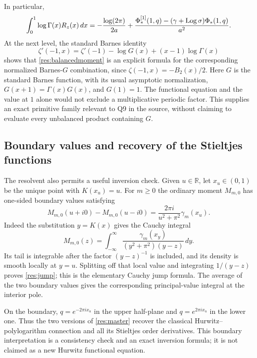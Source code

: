 In particular,
\begin{equation}\label{res:loggammamoment}
 \int_0^1\log\Gamma(x)R_z(x)\,dx
 =-\frac{\log(2\pi)}{2a}
   +\frac{\Phi_*^{[1]}(1,q)
                 -(\gamma+\operatorname{Log}\sigma)\Phi_*(1,q)}{a^2}.
\end{equation}
At the next level, the standard Barnes identity
\cite{Vardi}
\[
 \zeta'(-1,x)=\zeta'(-1)-\log G(x)+(x-1)\log\Gamma(x)
\]
shows that \eqref{res:balancedmoment} is an explicit formula for
the corresponding normalized Barnes-$G$ combination, since
$\zeta(-1,x)=-B_2(x)/2$. Here $G$ is the standard Barnes function, with its usual asymptotic
normalization, $G(x+1)=\Gamma(x)G(x)$, and $G(1)=1$. The
functional equation and the value at $1$ alone would not exclude
a multiplicative periodic factor. This supplies an exact primitive
family relevant to Q9 in the source, without claiming to evaluate
every unbalanced product containing $G$.

\subsection{Boundary values and recovery of the Stieltjes functions}

The resolvent also permits a useful inversion check. Given
$u\in\mathbb R$, let $x_u\in(0,1)$ be the unique point with
$K(x_u)=u$. For $m\ge0$ the ordinary moment $M_{m,0}$ has
one-sided boundary values satisfying
\begin{equation}\label{res:jump}
 M_{m,0}(u+i0)-M_{m,0}(u-i0)
       =\frac{2\pi i}{u^2+\pi^2}\gamma_m(x_u).
\end{equation}
Indeed the substitution $y=K(x)$ gives the Cauchy integral
\[
 M_{m,0}(z)=\int_{-\infty}^{\infty}
      \frac{\gamma_m(x_y)}{(y^2+\pi^2)(y-z)}\,dy.
\]
Its tail is integrable after the factor $(y-z)^{-1}$ is included,
and its density is smooth locally at $y=u$. Splitting off that
local value and integrating $1/(y-z)$ proves
\eqref{res:jump}; this is the elementary Cauchy jump formula.
The average of the two boundary values gives the corresponding
principal-value integral at the interior pole.

On the boundary, $q=e^{-2\pi ix_u}$ in the upper half-plane and
$q=e^{2\pi ix_u}$ in the lower one. Thus the two versions of
\eqref{res:master} recover the classical Hurwitz--polylogarithm
connection and all its Stieltjes order derivatives. This boundary
interpretation is a consistency check and an exact inversion formula;
it is not claimed as a new Hurwitz functional equation.


